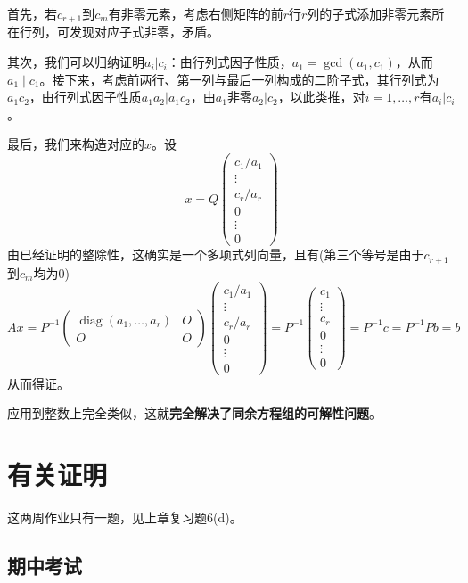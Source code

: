 \documentclass[a4paper,UTF8,fontset=windows,AutoFakeBold]{ctexart}
\DeclareMathOperator{\diag}{diag}
\newcommand*{\note}{\noindent *}
\begin{document}
\begin{enumerate}
\begin{itemize}
        首先，若$c_{r+1}$到$c_m$有非零元素，考虑右侧矩阵的前$r$行$r$列的子式添加非零元素所在行列，可发现对应子式非零，矛盾。

        其次，我们可以归纳证明$a_i|c_i$：由行列式因子性质，$a_1=\gcd(a_1,c_1)$，从而$a_1\mid c_1$。接下来，考虑前两行、第一列与最后一列构成的二阶子式，其行列式为$a_1c_2$，由行列式因子性质$a_1a_2|a_1c_2$，由$a_1$非零$a_2|c_2$，以此类推，对$i=1,\dots,r$有$a_i|c_i$。

        最后，我们来构造对应的$x$。设
        $$x=Q\begin{pmatrix}c_1/a_1\\\vdots\\c_r/a_r\\0\\\vdots\\0\end{pmatrix}$$
        由已经证明的整除性，这确实是一个多项式列向量，且有(第三个等号是由于$c_{r+1}$到$c_m$均为0)
        $$Ax=P^{-1}\begin{pmatrix}\diag(a_1,\dots,a_r)&O\\O&O\end{pmatrix}\begin{pmatrix}c_1/a_1\\\vdots\\c_r/a_r\\0\\\vdots\\0\end{pmatrix}=P^{-1}\begin{pmatrix}c_1\\\vdots\\c_r\\0\\\vdots\\0\end{pmatrix}=P^{-1}c=P^{-1}Pb=b$$
        从而得证。
    \end{itemize}

    \note 应用到整数上完全类似，这就\textbf{完全解决了同余方程组的可解性问题}。
\end{enumerate}

\section{有关证明}
\note 这两周作业只有一题，见上章复习题6(d)。

\subsection{期中考试}
\end{document}
